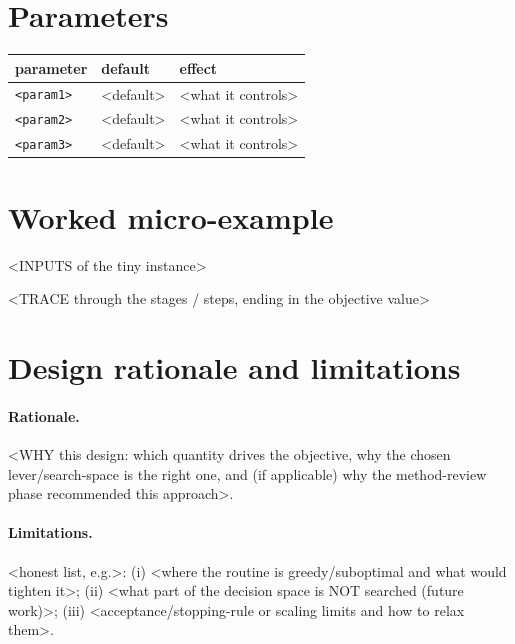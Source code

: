 \section{Parameters}
\begin{center}
\begin{tabular}{lll}
\hline
parameter & default & effect \\
\hline
\texttt{<param1>} & <default> & <what it controls> \\
\texttt{<param2>} & <default> & <what it controls> \\
\texttt{<param3>} & <default> & <what it controls> \\
\hline
\end{tabular}
\end{center}

\section{Worked micro-example}
<INPUTS of the tiny instance>

<TRACE through the stages / steps, ending in the objective value>

\section{Design rationale and limitations}

\paragraph{Rationale.} <WHY this design: which quantity drives the objective,
why the chosen lever/search-space is the right one, and (if applicable) why the
method-review phase recommended this approach>.

\paragraph{Limitations.} <honest list, e.g.>:
(i) <where the routine is greedy/suboptimal and what would tighten it>;
(ii) <what part of the decision space is NOT searched (future work)>;
(iii) <acceptance/stopping-rule or scaling limits and how to relax them>.
